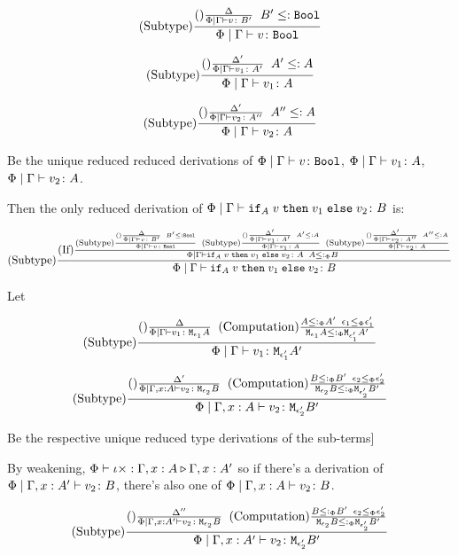 \documentclass{report}
\begin{document}
    \begin{equation}
        \edeltavrule{\P}{\G}{v}{B'}{\B}
    \end{equation}

    \begin{equation}
        \edeltavruleprime{\P}{\G}{v_1}{A'}{A}
    \end{equation}

    
    \begin{equation}
        \edeltavruleprimeprime{\P}{\G}{v_2}{A''}{A}
    \end{equation}

    Be the unique reduced reduced derivations of $\gpetyperelation{v}{\B}$, $\gpetyperelation{v_1}{A}$, $\gpetyperelation{v_2}{A}$.

    Then the only reduced derivation of $\gpetyperelation{\pifthenelse{A}{v}{v_1}{v_2}}{B}$ is:

    \begin{equation}
        \treerule{Subtype}{
            \treerule{If}{
                \edeltavrule{\P}{\G}{v}{B'}{\B}
                \s\s
                \edeltavruleprime{\P}{\G}{v_1}{A'}{A}
                \s\s
                \edeltavruleprimeprime{\P}{\G}{v_2}{A''}{A}
            }{\gpetyperelation{\pifthenelse{A}{v}{v_1}{v_2}}{A}\s\s A \subtypep B}
        }{\gpetyperelation{\pifthenelse{A}{v}{v_1}{v_2}}{B}}
    \end{equation}


    Let 

    \begin{equation}
        \edeltacrule{\G}{v_1}{\e_1}{A}{\e_1'}{A'}
    \end{equation}

    \begin{equation}
        \edeltacruleprime{\G, x:A}{v_2}{\e_2}{B}{\e_2'}{B'}
    \end{equation}

    Be the respective unique reduced type derivations of the sub-terms]

    By weakening, $\ewrel{\P}{\i\x}{\G, x:A}{\G, x: A'}$ so if there's a derivation of $\etyperelation{\P}{\G, x:A'}{v_2}{B}$, there's also one of   $\etyperelation{\P}{\gax}{v_2}{B}$.

    \begin{equation}
        \edeltacruleprimeprime{\G, x:A'}{v_2}{\e_2}{B}{\e_2'}{B'}
    \end{equation}
\end{document}
